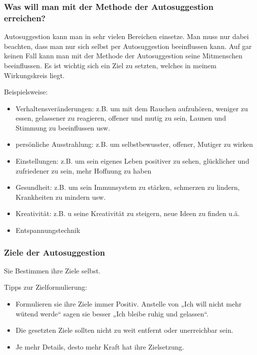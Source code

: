 \subsubsection{Was will man mit der Methode der Autosuggestion erreichen?}
Autosuggestion kann man in sehr vielen Bereichen einsetze. Man muss nur dabei beachten, dass man nur
sich selbst per Autosuggestion beeinflussen kann. Auf gar keinen Fall kann man  mit der Methode der
Autosuggestion seine Mitmenschen beeinflussen. Es ist wichtig sich ein Ziel zu setzten, welches in
meinem Wirkungskreis liegt.



Beispielsweise:
\begin{itemize}
	\item Verhaltensveränderungen: z.B. um mit dem Rauchen aufzuhören, weniger zu essen, gelassener
zu reagieren, offener und mutig zu sein, Launen und Stimmung zu beeinflussen usw.

	\item persönliche Ausstrahlung: z.B. um selbstbewusster, offener, Mutiger zu wirken
	\item Einstellungen: z.B. um sein eigenes Leben positiver zu sehen, glücklicher und zufriedener
zu sein, mehr Hoffnung zu haben

	\item Gesundheit: z.B. um sein Immunsystem zu stärken, schmerzen zu lindern, Krankheiten zu
mindern usw.

	\item Kreativität: z.B. u seine Kreativität zu steigern, neue Ideen zu finden u.ä.
	\item Entspannungstechnik
\end{itemize}

\subsubsection{Ziele der Autosuggestion}

Sie Bestimmen ihre Ziele selbst.

Tipps zur  Zielformulierung:
\begin{itemize}
	\item Formulieren sie ihre Ziele immer Positiv. Anstelle von „Ich will nicht mehr wütend werde“
		sagen sie besser „Ich bleibe ruhig und gelassen“.
	\item Die gesetzten Ziele sollten nicht zu weit entfernt oder unerreichbar sein.
	\item Je mehr Details, desto mehr Kraft hat ihre Zielsetzung.
\end{itemize}


